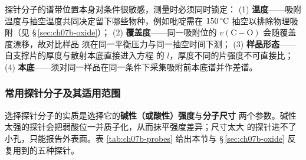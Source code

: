 \begin{measure}
探针分子的谱带位置本身对条件很敏感，测量时必须同时锁定：
(1) \textbf{温度}——吸附温度与抽空温度共同决定留下哪些物种，例如吡啶需在
$150\,\degC$ 抽空以排除物理吸附（见 \S\,\ref{sec:ch07b-oxide}）；
(2) \textbf{覆盖度}——同一吸附位的 $v(\mathrm{C{-}O})$ 会随覆盖度漂移，故对比样品
须在同一平衡压力与同一抽空时间下测；
(3) \textbf{样品形态}——自支撑片的厚度与散射本底直接进入方程
 的 $l$，厚度不同的片强度不可直接比；
(4) \textbf{本底}——须对同一样品在同一条件下采集吸附前本底谱并作差谱。
\end{measure}

\subsubsection{常用探针分子及其适用范围}

选择探针分子的实质是选择它的\textbf{碱性（或酸性）强度}与\textbf{分子尺寸}
两个参数。碱性太强的探针会把弱酸位一并质子化，从而抹平强度差异；尺寸太大
的探针进不了小孔，只能报告外表面。表 \ref{tab:ch07b-probes} 给出本节与
\S\,\ref{sec:ch07b-oxide} 反复用到的五种探针。


